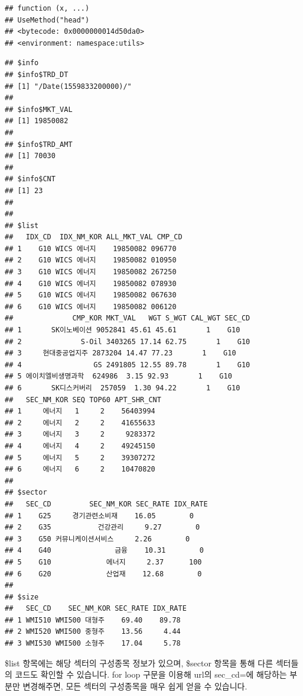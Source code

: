 \documentclass[12pt,]{book}
\begin{document}
\begin{verbatim}
## function (x, ...) 
## UseMethod("head")
## <bytecode: 0x0000000014d50da0>
## <environment: namespace:utils>
\end{verbatim}

\begin{verbatim}
## $info
## $info$TRD_DT
## [1] "/Date(1559833200000)/"
## 
## $info$MKT_VAL
## [1] 19850082
## 
## $info$TRD_AMT
## [1] 70030
## 
## $info$CNT
## [1] 23
## 
## 
## $list
##   IDX_CD  IDX_NM_KOR ALL_MKT_VAL CMP_CD
## 1    G10 WICS 에너지    19850082 096770
## 2    G10 WICS 에너지    19850082 010950
## 3    G10 WICS 에너지    19850082 267250
## 4    G10 WICS 에너지    19850082 078930
## 5    G10 WICS 에너지    19850082 067630
## 6    G10 WICS 에너지    19850082 006120
##              CMP_KOR MKT_VAL   WGT S_WGT CAL_WGT SEC_CD
## 1       SK이노베이션 9052841 45.61 45.61       1    G10
## 2              S-Oil 3403265 17.14 62.75       1    G10
## 3     현대중공업지주 2873204 14.47 77.23       1    G10
## 4                 GS 2491805 12.55 89.78       1    G10
## 5 에이치엘비생명과학  624986  3.15 92.93       1    G10
## 6       SK디스커버리  257059  1.30 94.22       1    G10
##   SEC_NM_KOR SEQ TOP60 APT_SHR_CNT
## 1     에너지   1     2    56403994
## 2     에너지   2     2    41655633
## 3     에너지   3     2     9283372
## 4     에너지   4     2    49245150
## 5     에너지   5     2    39307272
## 6     에너지   6     2    10470820
## 
## $sector
##   SEC_CD         SEC_NM_KOR SEC_RATE IDX_RATE
## 1    G25     경기관련소비재    16.05        0
## 2    G35           건강관리     9.27        0
## 3    G50 커뮤니케이션서비스     2.26        0
## 4    G40               금융    10.31        0
## 5    G10             에너지     2.37      100
## 6    G20             산업재    12.68        0
## 
## $size
##   SEC_CD    SEC_NM_KOR SEC_RATE IDX_RATE
## 1 WMI510 WMI500 대형주    69.40    89.78
## 2 WMI520 WMI500 중형주    13.56     4.44
## 3 WMI530 WMI500 소형주    17.04     5.78
\end{verbatim}

\$list 항목에는 해당 섹터의 구성종목 정보가 있으며, \$sector 항목을 통해 다른 섹터들의 코드도 확인할 수 있습니다. for loop 구문을 이용해 url의 sec\_cd=에 해당하는 부분만 변경해주면, 모든 섹터의 구성종목을 매우 쉽게 얻을 수 있습니다.
\end{document}
